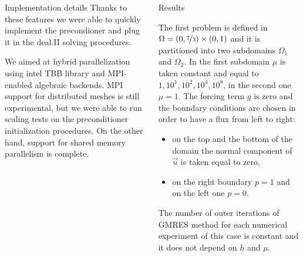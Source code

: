 \documentclass[final]{beamer}
\newlength{\onecolwid}
\begin{document}
\begin{frame}[t]
\begin{columns}[t]
\begin{column}{\onecolwid}
\begin{block}{Implementation details}
Thanks to these features we were able to quickly implement the precondioner
and plug it in the deal.II solving procedures.

We aimed at hybrid parallelization using intel TBB library and MPI-enabled
algebraic backends.
MPI support for distributed meshes is still experimental, but we were able
to run scaling tests on the preconditioner initialization procedures.
On the other hand, support for shared memory parallelism is complete.

\end{block}


\end{column} %


\begin{column}{\onecolwid} %

\begin{block}{Results}

The first problem is defined in $\Omega = (0,\nicefrac{7}{3}) \times (0,1)$ and
it is partitioned into two subdomains $\Omega_1$ and $\Omega_2$. In the first subdomain $\mu$ is taken
constant and equal to $1, 10^{1}, 10^{2}, 10^{4}, 10^{8}$, in the second one
$\mu=1$. The forcing term $g$ is zero and the boundary conditions are chosen in
order to have a flux from left to right:
\begin{itemize}
  \item on the top and the bottom of the domain the normal component of
    $\vec{u}$ is taken equal to zero,
  \item on the right boundary $p=1$ and on the left one $p=0$.
\end{itemize}

\begin{figure}
    \begin{tikzpicture}[scale=2.5,font=\small]
        
    \end{tikzpicture}
\end{figure}

The number of outer iterations of GMRES method for each numerical experiment of
this case is constant and it does not depend on $h$ and $\mu$.

\begin{table}
    {\small }
\end{table}

$\;$


\end{block}
\end{column}
\end{columns}
\end{frame}
\end{document}
